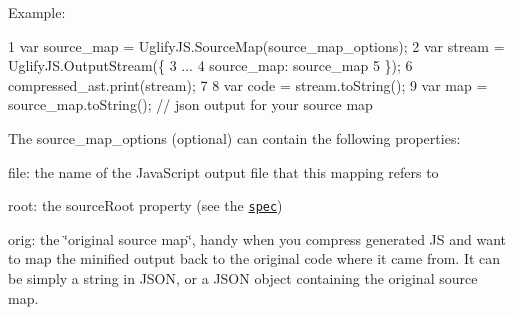 Example\+: 
\begin{DoxyCode}
1 var source\_map = UglifyJS.SourceMap(source\_map\_options);
2 var stream = UglifyJS.OutputStream(\{
3     ...
4     source\_map: source\_map
5 \});
6 compressed\_ast.print(stream);
7 
8 var code = stream.toString();
9 var map = source\_map.toString(); // json output for your source map
\end{DoxyCode}


The {\ttfamily source\+\_\+map\+\_\+options} (optional) can contain the following properties\+:


\begin{DoxyItemize}
\item {\ttfamily file}\+: the name of the Java\+Script output file that this mapping refers to
\item {\ttfamily root}\+: the {\ttfamily source\+Root} property (see the \href{https://docs.google.com/document/d/1U1RGAehQwRypUTovF1KRlpiOFze0b-_2gc6fAH0KY0k/edit}{\tt spec})
\item {\ttfamily orig}\+: the \char`\"{}original source map\char`\"{}, handy when you compress generated J\+S and want to map the minified output back to the original code where it came from. It can be simply a string in J\+S\+O\+N, or a J\+S\+O\+N object containing the original source map. 
\end{DoxyItemize}